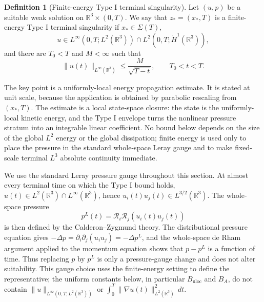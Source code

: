 \documentclass[11pt]{amsart}
\theoremstyle{plain}
\theoremstyle{definition}
\newtheorem{definition}[definition]{Definition}
\theoremstyle{remark}
\begin{document}
\begin{definition}[Finite-energy Type I terminal singularity]
\label{def:finite-energy-typeI-paper0}
Let \((u,p)\) be a suitable weak solution on \(\mathbb R^3\times(0,T)\).
We say that \(z_*=(x_*,T)\) is a finite-energy Type I terminal singularity if
\(x_*\in\Sigma(T)\),
\[
  u\in L^\infty(0,T;L^2(\mathbb R^3))
  \cap L^2(0,T;\dot H^1(\mathbb R^3)),
\]
and there are \(T_0<T\) and \(M<\infty\) such that
\begin{equation}\label{eq:paper0-global-typeI}
  \|u(t)\|_{L^\infty(\mathbb R^3)}
  \le \frac{M}{\sqrt{T-t}},
  \qquad T_0<t<T .
\end{equation}
\end{definition}

The key point is a uniformly-local energy propagation estimate.  It is stated
at unit scale, because the application is obtained by parabolic rescaling from
\((x_*,T)\).  The estimate is a local state-space closure: the state is the
uniformly-local kinetic energy, and the Type I envelope turns the nonlinear
pressure stratum into an integrable linear coefficient.  No bound below
depends on the size of the global \(L^2\) energy or the global dissipation;
finite energy is used only to place the pressure in the standard whole-space
Leray gauge and to make fixed-scale terminal \(L^3\) absolute continuity
immediate.

We use the standard Leray pressure gauge throughout this section.  At almost
every terminal time on which the Type I bound holds,
\(u(t)\in L^2(\mathbb R^3)\cap L^\infty(\mathbb R^3)\), hence
\(u_i(t)u_j(t)\in L^{3/2}(\mathbb R^3)\).  The whole-space pressure
\[
  p^L(t)=\mathcal R_i\mathcal R_j(u_i(t)u_j(t))
\]
is then defined by the Calderon--Zygmund theory.  The distributional pressure
equation gives
\(-\Delta p=\partial_i\partial_j(u_i u_j)=-\Delta p^L\), and the whole-space
de Rham argument applied to the momentum equation shows that \(p-p^L\) is a
function of time.  Thus replacing \(p\) by \(p^L\) is only a pressure-gauge
change and does not alter suitability.  This gauge choice uses the
finite-energy setting to define the representative; the uniform constants
below, in particular \(B_{\mathrm{uloc}}\) and \(B_A\), do not contain
\(\|u\|_{L^\infty(0,T;L^2(\mathbb R^3))}\) or
\(\int_0^T\|\nabla u(t)\|_{L^2(\mathbb R^3)}^2\,dt\).
\end{document}
